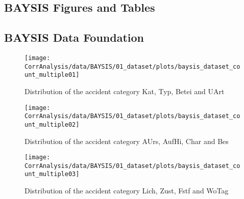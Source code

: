 \begin{appendices}

    \chapter{BAYSIS Figures and Tables}
    \label{appendix_baysis}
    
    \tocless\section{BAYSIS Data Foundation}
    \label{appendix_baysis_dataset}
    
    \begin{figure}[!ht]
        \centering
        \texttt{[image: CorrAnalysis/data/BAYSIS/01\_dataset/plots/baysis\_dataset\_count\_multiple01]}
        \caption{Distribution of the accident category Kat, Typ, Betei and UArt}
        \label{img:appendix_baysis_dataset_Kat}
        \label{img:appendix_baysis_dataset_Typ}
        \label{img:appendix_baysis_dataset_Betei}
        \label{img:appendix_baysis_dataset_UArt}
    \end{figure}

    \begin{figure}[!ht]
        \centering
        \texttt{[image: CorrAnalysis/data/BAYSIS/01\_dataset/plots/baysis\_dataset\_count\_multiple02]}
        \caption{Distribution of the accident category AUrs, AufHi, Char and Bes}
        \label{img:appendix_baysis_dataset_AUrs}
        \label{img:appendix_baysis_dataset_AufHi}
        \label{img:appendix_baysis_dataset_Char}
        \label{img:appendix_baysis_dataset_Bes}
    \end{figure}

    \begin{figure}[!ht]
        \centering
        \texttt{[image: CorrAnalysis/data/BAYSIS/01\_dataset/plots/baysis\_dataset\_count\_multiple03]}
        \caption{Distribution of the accident category Lich, Zust, Fstf and WoTag}
        \label{img:appendix_baysis_dataset_Char_Bes_Lich}
        \label{img:appendix_baysis_dataset_Char_Bes_Zust}
        \label{img:appendix_baysis_dataset_Char_Bes_Fstf}
        \label{img:appendix_baysis_dataset_Char_Bes_WoTag}
    \end{figure}


\end{appendices}
